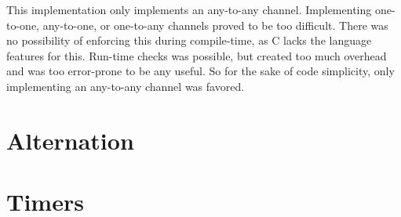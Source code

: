 This implementation only implements an any\hyp{}to\hyp{}any channel. Implementing one\hyp{}to\hyp{}one, any\hyp{}to\hyp{}one, or one\hyp{}to\hyp{}any channels proved to be too difficult. There was no possibility of enforcing this during compile\hyp{}time, as C lacks the language features for this. Run\hyp{}time checks was possible, but created too much overhead and was too error\hyp{}prone to be any useful. So for the sake of code simplicity, only implementing an any\hyp{}to\hyp{}any channel was favored. 

\section{Alternation}



\section{Timers}






